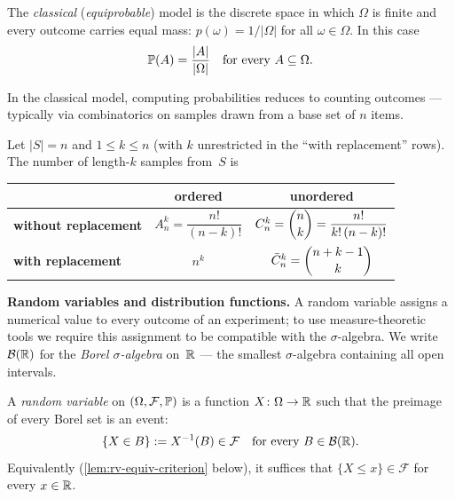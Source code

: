 \begin{definition}
\label{def:classical-model}
The \emph{classical} (\emph{equiprobable}) model is the discrete space
in which $\Omega$ is finite and every outcome carries equal mass:
$p(\omega) = 1/|\Omega|$ for all $\omega \in \Omega$. In this case
\[
  \mathbb{P}(A) = \frac{|A|}{|\Omega|} \quad \text{for every } A \subseteq \Omega.
\]
\end{definition}

In the classical model, computing probabilities reduces to counting
outcomes — typically via combinatorics on samples drawn from a base
set of $n$ items.

\begin{proposition}
\label{prop:sampling-formulas}
Let $|S| = n$ and $1 \leq k \leq n$ (with $k$ unrestricted in the
``with replacement'' rows). The number of length-$k$ samples
from~$S$ is
\begin{center}
\begin{tabular}{lcc}
\toprule
 & \textbf{ordered} & \textbf{unordered} \\
\midrule
\textbf{without replacement} & $A_n^k = \dfrac{n!}{(n-k)!}$ & $C_n^k = \dbinom{n}{k} = \dfrac{n!}{k!\,(n-k)!}$ \\[6pt]
\textbf{with replacement}    & $n^k$ & $\bar C_n^k = \dbinom{n+k-1}{k}$ \\
\bottomrule
\end{tabular}
\end{center}
\end{proposition}

\medskip
\noindent\textbf{Random variables and distribution functions.} A random
variable assigns a numerical value to every outcome of an experiment;
to use measure-theoretic tools we require this assignment to be
compatible with the $\sigma$-algebra. We write $\mathcal{B}(\mathbb{R})$ for the
\emph{Borel $\sigma$-algebra} on~$\mathbb{R}$ — the smallest $\sigma$-algebra
containing all open intervals.

\begin{definition}
\label{def:random-variable}
A \emph{random variable} on $(\Omega, \mathcal{F}, \mathbb{P})$ is a function
$X \colon \Omega \to \mathbb{R}$ such that the preimage of every Borel set is
an event:
\[
  \{X \in B\} := X^{-1}(B) \in \mathcal{F} \quad \text{for every } B \in \mathcal{B}(\mathbb{R}).
\]
Equivalently (\cref{lem:rv-equiv-criterion} below), it suffices that
$\{X \leq x\} \in \mathcal{F}$ for every $x \in \mathbb{R}$.
\end{definition}


